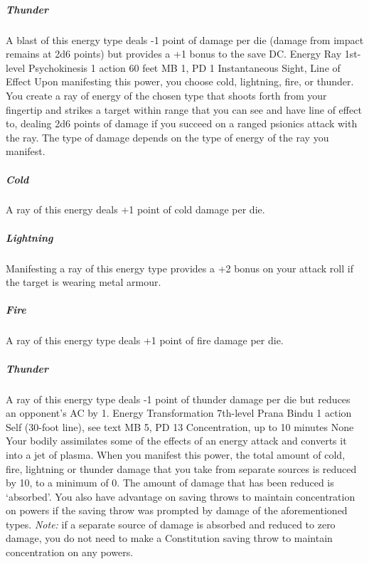 \subparagraph{Thunder}
A blast of this energy
type deals -1 point of damage per die
(damage from impact
remains at 2d6 points)
but provides a +1 bonus to the save DC.
\DndPowerHeader%
    {Energy Ray\label{pwr:energy_ray}}
    {1st-level Psychokinesis}
    {1 action}
    {60 feet}
    {MB 1, PD 1}
    {Instantaneous}
    {Sight, Line of Effect}
Upon manifesting this power,
you choose cold, lightning, fire, or thunder.
You create a ray of energy of the chosen type that
shoots forth from your fingertip and strikes a target within range
that you can see and have line of effect to,
dealing 2d6 points of damage if you succeed on a
ranged psionics attack with the ray.
The type of damage depends on
the type of energy of the ray you manifest. 

\subparagraph{Cold}
  A ray of this energy deals +1 point of cold damage per die.

\subparagraph{Lightning}
  Manifesting a ray of this energy type provides a
  +2 bonus on your attack roll if the target is wearing metal armour.

\subparagraph{Fire}
  A ray of this energy type deals +1 point of fire damage per die.

\subparagraph{Thunder}
  A ray of this energy type deals -1 point of thunder damage per die
  but reduces an opponent's AC by 1.
\DndPowerHeader%
    {Energy Transformation\label{pwr:energy_transformation}}
    {7th-level Prana Bindu}
    {1 action}
    {Self (30-foot line), see text}
    {MB 5, PD 13}
    {Concentration, up to 10 minutes}
    {None}
Your bodily assimilates some of the effects
of an energy attack and converts it into a jet of plasma.
When you manifest this power, the total amount of cold, fire,
lightning or thunder damage that you take from separate sources
is reduced by 10, to a minimum of 0. The amount of damage
that has been reduced is `absorbed'. You also have advantage
on saving throws to maintain concentration on powers if the
saving throw was prompted by damage of the aforementioned
types. \emph{Note:} if a separate source of damage is absorbed
and reduced to zero damage,
you do not need to make a Constitution saving throw
to maintain concentration on any powers.

